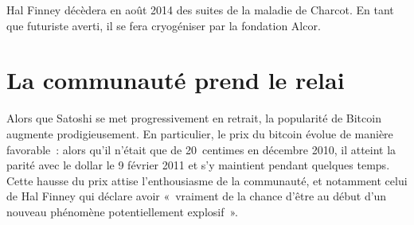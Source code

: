 Hal Finney décèdera en août 2014 des suites de la maladie de Charcot. En tant que futuriste averti, il se fera cryogéniser par la fondation Alcor.

\section*{La communauté prend le relai}

Alors que Satoshi se met progressivement en retrait, la popularité de Bitcoin augmente prodigieusement. En particulier, le prix du bitcoin évolue de manière favorable~: alors qu'il n'était que de 20~centimes en décembre 2010, il atteint la parité avec le dollar le 9 février 2011 et s'y maintient pendant quelques temps. Cette hausse du prix attise l'enthousiasme de la communauté, et notamment celui de Hal Finney qui déclare avoir «~vraiment de la chance d'être au début d'un nouveau phénomène potentiellement explosif~».


